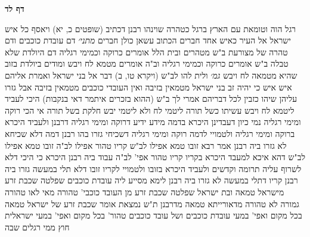\documentclass[12pt, openany]{book}
\newcommand{\sethebfont}{
\fontsize{10.5pt}{21.0pt} \selectfont
}
\newcommand{\twocol}[1]{
	{\sethebfont \begin{multicols}{2}
			#1
	\end{multicols}}	
}
\newcommand{\sectname}{}
\newcommand{\newsection}[1]{
	\addcontentsline{toc}{section}{#1}
	\renewcommand{\sectname}{#1}	
	\vspace{-\baselineskip}
	\begin{center}
		\textbf{%
\fontsize{16pt}{16pt}\selectfont
			#1}
	\end{center}
	\vspace{-\baselineskip}
	\nopagebreak
}
\begin{document}
\newsection{דף לד}
\twocol{רגל הוה וטומאת עם הארץ ברגל כטהרה שוינהו רבנן דכתיב  (שופטים כ, יא) ויאסף כל איש ישראל אל העיר כאיש אחד חברים הכתוב עשאן כולן חברים
{\large\emph{מתני׳}} דם עובדת כוכבים ודם טהרה של מצורעת ב"ש מטהרים ובית הלל אומרים כרוקה וכמימי רגליה 
דם היולדת שלא טבלה ב"ש אומרים  כרוקה וכמימי רגליה וב"ה אומרים  מטמא לח ויבש 
ומודים ביולדת בזוב שהיא מטמאה לח ויבש
{\large\emph{גמ׳}} ולית להו לב"ש (ויקרא טו, ב) דבר אל בני ישראל ואמרת אליהם איש איש כי יהיה זב בני ישראל מטמאין בזיבה ואין העובדי כוכבים מטמאין בזיבה אבל גזרו עליהן שיהו כזבין לכל דבריהם
אמרי לך ב"ש  (ההוא בזכרים איתמר דאי בנקבות) היכי לעביד  ליטמא לח ויבש עשיתו כשל תורה ליטמי לח ולא ליטמי יבש חלקת בשל תורה 
אי הכי רוקה ומימי רגליה נמי  כיון דעבדינן היכרא בדמה מידע ידיע דרוקה ומימי רגליה דרבנן 
ולעביד היכרא ברוקה ומימי רגליה ולטמויי לדמה  רוקה ומימי רגליה דשכיחי גזרו בהו רבנן דמה דלא שכיחא לא גזרו ביה רבנן 
אמר רבא  זובו טמא אפילו לב"ש קריו טהור אפילו לב"ה 
זובו טמא אפילו לב"ש דהא איכא למעבד היכרא בקריו
קריו טהור אפי' לב"ה עבוד ביה רבנן היכרא כי היכי דלא לשרוף עליה תרומה וקדשים 
ולעביד היכרא בזובו ולטמויי לקריו  זובו דלא תלי במעשה גזרו ביה רבנן קריו דתלי במעשה לא גזרו ביה רבנן 
לימא מסייע ליה  עובדת כוכבים שפלטה שכבת זרע מישראל טמאה ובת ישראל שפלטה שכבת זרע מן העובד כוכבי' טהורה  מאי לאו טהורה גמורה  לא טהורה מדאורייתא טמאה מדרבנן 
ת"ש נמצאת אומר  שכבת זרע של ישראל טמאה בכל מקום
ואפי' במעי עובדת כוכבים  ושל עובד כוכבים טהור' בכל מקום ואפי' במעי ישראלית חוץ ממי רגלים שבה 
}
\end{document}
